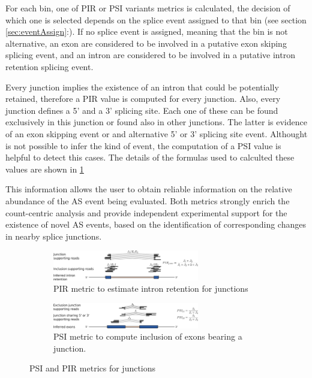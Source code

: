 \documentclass{article}
\newcommand{\secref}[1]{\ref{#1}:\nameref{#1}}
\begin{document}
For each bin, one of PIR or PSI variants metrics is calculated, the decision of
which one is selected depends on the splice event assigned to that bin (see
section \secref{sec:eventAssign}). If no splice event is assigned, meaning that
the bin is not alternative, an exon are considered to be involved in
a putative exon skiping splicing event, and an intron are considered to be
involved in a putative intron retention splicing event. 

Every junction implies the existence of an intron that could be potentially 
retained, therefore a PIR value is computed for every junction. Also, every
junction defines a 5' and a 3' splicing site. Each one of these can be found
exclusively in this junction or found also in other junctions. The latter is
evidence of an exon skipping event or and alternative 5' or 3' splicing site
event. Althought is not possible to infer the kind of event, the computation of
a PSI value is helpful to detect this cases. The details of the formulas used to
calculted these values are shown in \ref{fig:psir_junc}

This information allows the user to obtain reliable information on the relative
abundance of the AS event being evaluated. Both metrics strongly enrich the 
count-centric analysis and provide independent experimental support for the 
existence of novel AS events, based on the identification of corresponding 
changes in nearby splice junctions.

\begin{figure}
  \begin{subfigure}[t]{1\textwidth}
    \centering
    \includegraphics[width=0.7\textwidth]{images/pir_junc.pdf}
    \caption{ PIR metric to estimate intron retention for junctions}
  \end{subfigure}
  \begin{subfigure}[t]{1\textwidth}
    \centering
    \includegraphics[width=0.7\textwidth]{images/psi_junc.pdf}
    \caption{ PSI metric to compute inclusion of exons bearing a junction.} 
  \end{subfigure}
  \caption{PSI and PIR metrics for junctions}
  \label{fig:psir_junc}
\end{figure}
\end{document}
